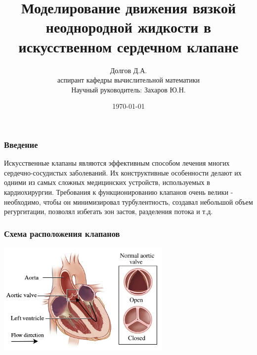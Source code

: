 \documentclass[14pt]{beamer}
\title[Моделирование движения жидкости в клапане]{Моделирование движения вязкой неоднородной жидкости в искусственном сердечном клапане}
\date{\today}
\author[Долгов Д.А.]{Долгов Д.А.\\ {\small аспирант кафедры вычислительной математики}\\ {\small Научный руководитель: Захаров Ю.Н.}}
\institute{Кемеровский Государственный Университет \\
    \vspace{0.7cm}
    \vspace{0.7cm}
}
\begin{document}
\maketitle

\begin{frame}
\frametitle{Введение}
Искусственные клапаны являются эффективным способом лечения многих сердечно-сосудистых заболеваний. Их конструктивные особенности делают их одними из самых сложных медицинских устройств, используемых в кардиохирургии. Требования к функционированию клапанов очень велики - необходимо, чтобы он минимизировал турбулентность, создавал небольшой объем регургитации, позволял избегать зон застоя, разделения потока и т.д.
\end{frame}

\begin{frame}
\frametitle{Схема расположения клапанов}
    \begin{center}
        \includegraphics[width=8.5cm]{aorta_scheme.png}
    \end{center}
\end{frame}
\end{document}
